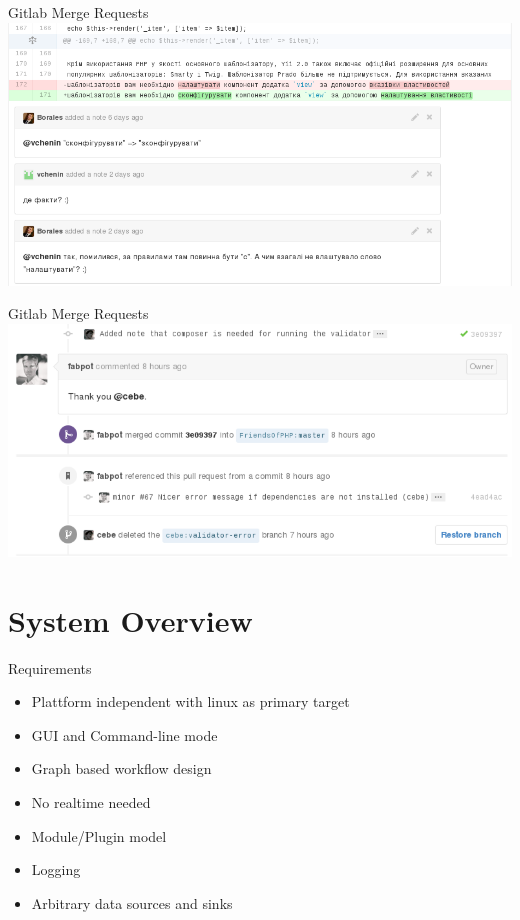 \documentclass{beamer}
\begin{document}
\begin{frame}{Gitlab Merge Requests}
	\includegraphics[width=\textwidth]{images/gitlab_pr_comment}

\end{frame}

\begin{frame}{Gitlab Merge Requests}
	\includegraphics[width=\textwidth]{images/gitlab_pr_merge}

\end{frame}


\section{System Overview}

\begin{frame}{Requirements}

	\begin{itemize}
		\item Plattform independent with linux as primary target \pause
		\item GUI and Command-line mode \pause
		\item Graph based workflow design \pause
		\item No realtime needed \pause
		\item Module/Plugin model \pause
		\item Logging \pause
		\item Arbitrary data sources and sinks
	\end{itemize}

\end{frame}
\end{document}
